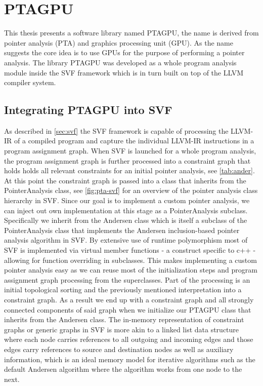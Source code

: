 \chapter{PTAGPU} \label{chap:main}
This thesis presents a software library named PTAGPU, the name is derived from pointer analysis (PTA) and graphics processing unit (GPU).
As the name suggests the core idea is to use GPUs for the purpose of performing a pointer analysis.
The library PTAGPU was developed as a whole program analysis module inside the SVF framework which is in turn built on top of the LLVM compiler system.
\section{Integrating PTAGPU into SVF}
As described in \autoref{sec:svf} the SVF framework is capable of processing the LLVM-IR of a compiled program and capture the individual LLVM-IR instructions in a program assignment graph.
When SVF is launched for a whole program analysis, the program assignment graph is further processed into a constraint graph that holds holds all relevant constraints for an initial pointer analysis, see \autoref{tab:ander}.
At this point the constraint graph is passed into a class that inherits from the PointerAnalysis class, see \autoref{fig:pta-svf} for an overview of the pointer analysis class hierarchy in SVF.
Since our goal is to implement a custom pointer analysis, we can inject out own implementation at this stage as a PointerAnalysis subclass.
Specifically we inherit from the Andersen class which is itself a subclass of the PointerAnalysis class that implements the Andersen inclusion-based pointer analysis algorithm in SVF.
By extensive use of runtime polymorphism most of SVF is implemented via virtual member functions - a construct specific to c++ - allowing for function overriding in subclasses. This makes implementing a custom pointer analysis easy as we can reuse most of the initialization steps and program assignment graph processing from the superclasses. Part of the processing is an initial topological sorting and the previously mentioned interpretation into a constraint graph.
As a result we end up with a constraint graph and all strongly connected components of said graph when we initialize our PTAGPU class that inherits from the Andersen class.
The in-memory representation of constraint graphs or generic graphs in SVF is more akin to a linked list data structure where each node carries references to all outgoing and incoming edges and those edges carry references to source and destination nodes as well as auxiliary information, which is an ideal memory model for iterative algorithms such as the default Andersen algorithm where the algorithm works from one node to the next.
